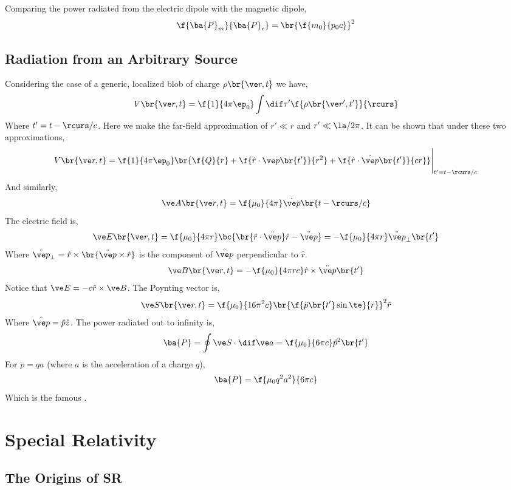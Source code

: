 \documentclass{article}
\begin{document}
Comparing the power radiated from the electric dipole with the magnetic dipole,
\[ \f{\ba{P}_{m}}{\ba{P}_{e}} = \br{\f{m_0}{p_0c}}^2 \]

\subsection{Radiation from an Arbitrary Source}

Considering the case of a generic, localized blob of charge $\rho\br{\ve r, t}$ we have,
\[ V\br{\ve r, t} = \f{1}{4 \pi \ep_0} \int \dif \tau' \f{\rho\br{\ve r', t'}}{\rcurs} \]
Where $t' = t - \rcurs / c$. Here we make the far-field approximation of $r' \ll r$ and $r' \ll \la / 2 \pi$. It can be shown that under these two approximations,
\[ V\br{\ve r, t} = \f{1}{4 \pi \ep_0} \br{\f{Q}{r} + \f{\hat r \cdot \ve p \br{t'}}{r^2} + \f{\hat r \cdot \dot {\ve p}\br{t'}}{cr}} \Bigg|_{t' = t - \rcurs / c} \]
And similarly,
\[ \ve A\br{\ve r, t} = \f{\mu_0}{4 \pi} \dot {\ve p}\br{t - \rcurs / c}  \]
The electric field is,
\[ \ve E\br{\ve r, t} = \f{\mu_0}{4 \pi r} \bc{\br{\hat r \cdot \ddot{\ve p}}\hat r - \ddot{\ve p}} = - \f{\mu_0}{4 \pi r} \ddot{\ve p}_{\perp}\br{t'} \]
Where $\ddot{\ve p}_{\perp} = \hat r \times \br{\ddot{\ve p} \times \hat r}$ is the component of $\ddot{\ve p}$ perpendicular to $\hat r$.
\[ \ve B\br{\ve r, t} = - \f{\mu_0}{4 \pi r c} \hat r \times \ddot{\ve p} \br{t'}  \]
Notice that $\ve E = - c \hat r \times \ve B$. The Poynting vector is,
\[ \ve S \br{\ve r, t} = \f{\mu_0}{16 \pi^2 c} \br{\f{\ddot p \br{t'} \sin \te }{r}}^2 \hat r\]
Where $\ddot{\ve p} = \ddot p \hat z$. The power radiated out to infinity is,
\[ \ba{P} = \oint \ve S \cdot \dif \ve a = \f{\mu_0}{6 \pi c} \ddot p^2 \br{t'} \]
For $\ddot p = q a$ (where $a$ is the acceleration of a charge $q$),
\[ \ba{P} = \f{\mu_0 q^2 a^2}{6 \pi c} \]
Which is the famous .

\section{Special Relativity}

\subsection{The Origins of SR}
\end{document}
